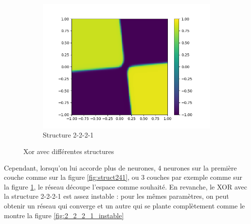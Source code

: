 \begin{figure}[ht!]
\begin{subfigure}[b]{.3\linewidth}
    \includegraphics[width=\linewidth]{fig/xor2221_eta05.png}
    \caption{Structure 2-2-2-1}
    \label{fig:struct2221}
  \end{subfigure}
  \caption{Xor avec différentes structures}
  \label{structxor}
\end{figure}

Cependant, lorsqu'on lui accorde plus de neurones, 4 neurones sur la première couche comme sur la figure \ref{fig:struct241}, ou 3 couches par exemple comme sur la figure \ref{fig:struct2221}, le réseau découpe l'espace comme souhaité. En revanche, le XOR avec la structure 2-2-2-1 est assez instable : pour les mêmes paramètres, on peut obtenir un réseau qui converge et un autre qui se plante complètement comme le montre la figure \ref{fig:2_2_2_1_instable}
	
